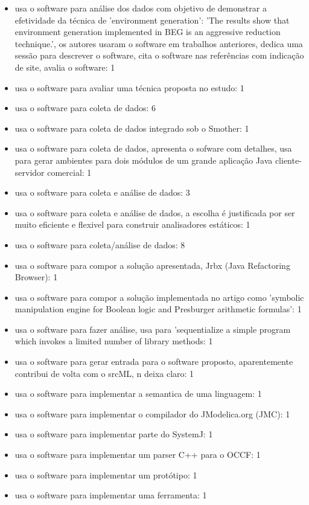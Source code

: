 \begin{itemize}
\item usa o software para análise dos dados com objetivo de demonstrar a efetividade da técnica de 'environment generation': 'The results show that environment generation implemented in BEG is an aggressive reduction technique.', os autores usaram o software em trabalhos anteriores, dedica uma sessão para descrever o software, cita o software nas referências com indicação de site, avalia o software: 1
\item usa o software para avaliar uma técnica proposta no estudo: 1
\item usa o software para coleta de dados: 6
\item usa o software para coleta de dados integrado sob o Smother: 1
\item usa o software para coleta de dados, apresenta o sofware com detalhes, usa para gerar ambientes para dois módulos de um grande aplicação Java cliente-servidor comercial: 1
\item usa o software para coleta e análise de dados: 3
\item usa o software para coleta e análise de dados, a escolha é justificada por ser muito eficiente e flexivel para construir analisadores estáticos: 1
\item usa o software para coleta/análise de dados: 8
\item usa o software para compor a solução apresentada, Jrbx (Java Refactoring Browser): 1
\item usa o software para compor a solução implementada no artigo como 'symbolic manipulation engine for Boolean logic and Presburger arithmetic formulas': 1
\item usa o software para fazer análise, usa para 'sequentialize a simple program which invokes a limited number of library methods: 1
\item usa o software para gerar entrada para o software proposto, aparentemente contribui de volta com o srcML, n deixa claro: 1
\item usa o software para implementar a semantica de uma linguagem: 1
\item usa o software para implementar o compilador do JModelica.org (JMC): 1
\item usa o software para implementar parte do SystemJ: 1
\item usa o software para implementar um parser C++ para o OCCF: 1
\item usa o software para implementar um protótipo: 1
\item usa o software para implementar uma ferramenta: 1

\end{itemize}
